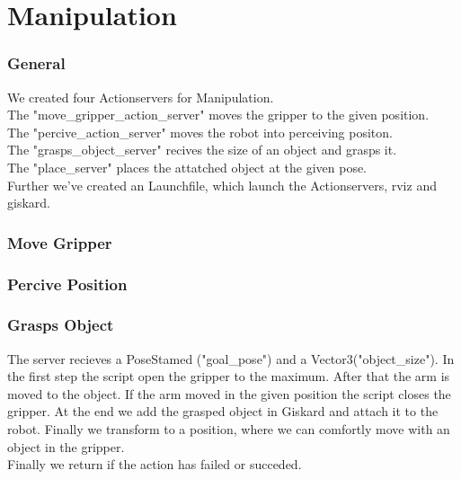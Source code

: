 \documentclass[main.tex]{subfiles}
\begin{document}
	
	\chapter{Manipulation}
	
	\subsection{General}
	We created four Actionservers for Manipulation.\\
	The "move\_gripper\_action\_server" moves the gripper to the given position.\\
	The "percive\_action\_server" moves the robot into perceiving positon.\\
	The "grasps\_object\_server" recives the size of an object and grasps it.\\
	The "place\_server" places the attatched object at the given pose.\\
	Further we've created an Launchfile, which launch the Actionservers, rviz and giskard.
	
	\vspace{1cm}
	
	\subsection{Move Gripper}
	
	\vspace{1cm}
	
	\subsection{Percive Position}

	\vspace{1cm}
	
	\subsection{Grasps Object}
	The server recieves a PoseStamed ("goal\_pose") and a Vector3("object\_size"). In the first step the script open the gripper to the maximum. After that the arm is moved to the object. If the arm moved in the given position the script closes the gripper. At the end we add the grasped object in Giskard and attach it to the robot. Finally we transform to a position, where we can comfortly move with an object in the gripper.\\
	Finally we return if the action has failed or succeded.
	
\end{document}
